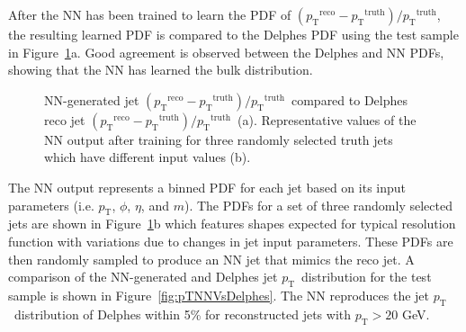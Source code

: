 \documentclass[showpacs,showkeys,preprint,prd,nofootinbib,linenumbers,12pt,superscriptaddress]{revtex4-1}
\def\pt{\ensuremath{p_{\mathrm{T}}}}
\def\ptRes{\ensuremath{(\pt^{\mathrm{reco}}-\pt^{\mathrm{truth}})/\pt^{\mathrm{truth}}}}
\begin{document}
After the NN has been trained to learn the PDF of \ptRes, the resulting learned PDF is compared to the Delphes PDF using the test sample in Figure~\ref{fig:PDFComp}a. Good agreement is observed between the Delphes and NN PDFs, showing that the NN has learned the bulk distribution.

\begin{figure}[htb]
  \caption{NN-generated jet \ptRes\ compared to Delphes reco jet \ptRes\ (a). Representative values of the NN output after training for three randomly selected truth jets which have different input values (b).}
  \label{fig:PDFComp}
\end{figure}

The NN output represents a binned PDF for each jet based on its input parameters (i.e. \pt, $\phi$, $\eta$, and $m$). The PDFs for a set of three randomly selected jets are shown in Figure~\ref{fig:PDFComp}b which features shapes expected for typical resolution function with variations due to changes in jet input parameters. These PDFs are then randomly sampled to produce an NN jet that mimics the reco jet. A comparison of the NN-generated and Delphes jet \pt\ distribution for the test sample is shown in Figure~\ref{fig:pTNNVsDelphes}. The NN reproduces the jet \pt\ distribution of Delphes within 5\% for reconstructed jets with $\pt>20$ GeV. 
\end{document}
